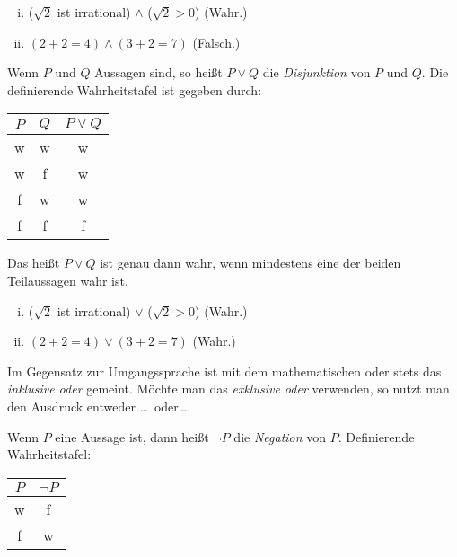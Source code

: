 \begin{example}
\begin{enumerate}[(i)]
\item ($\sqrt{2}$ ist irrational) $\wedge$ ($\sqrt{2} > 0$) (Wahr.)
\item $(2 + 2 = 4) \wedge (3 + 2 = 7)$ (Falsch.)
\end{enumerate}
\end{example}


\begin{mydef}
Wenn $P$ und $Q$ Aussagen sind, so heißt $P \vee Q$ die \textit{Disjunktion}
von $P$ und $Q$.
Die definierende Wahrheitstafel ist gegeben durch:

\begin{table}[H]
\centering
\begin{tabular}{c|c|c}
$P$ & $Q$ & $P \vee Q$ \\ \hline
w   & w   & w \\
w   & f   & w \\
f   & w   & w \\
f   & f   & f
\end{tabular}
\end{table}

Das heißt $P \vee Q$ ist genau dann wahr, wenn mindestens eine der beiden
Teilaussagen wahr ist.
\end{mydef}


\begin{example}
\begin{enumerate}[(i)]
\item ($\sqrt{2}$ ist irrational) $\vee$ ($\sqrt{2} > 0$) (Wahr.)
\item $(2 + 2 = 4) \vee (3 + 2 = 7)$ (Wahr.)
\end{enumerate}
\end{example}


\begin{remark}
Im Gegensatz zur Umgangssprache ist mit dem mathematischen oder stets das
\textit{inklusive oder} gemeint.
Möchte man das \textit{exklusive oder} verwenden, so nutzt man den Ausdruck
\glqq entweder \ldots\ oder\ldots\grqq.
\end{remark}


\begin{mydef}
Wenn $P$ eine Aussage ist, dann heißt $\neg P$ die \textit{Negation} von $P$.
Definierende Wahrheitstafel:

\begin{table}[H]
\centering
\begin{tabular}{c|c}
$P$ & $\neg P$ \\ \hline
w   & f \\
f   & w
\end{tabular}
\end{table}
\end{mydef}


